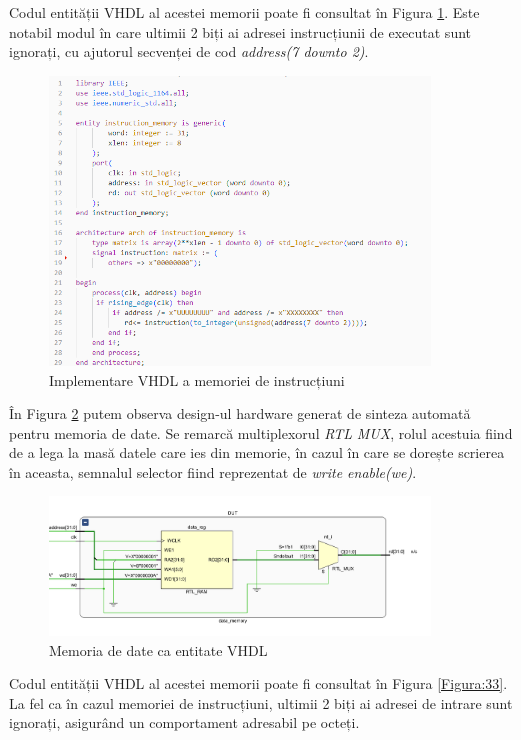 \documentclass[12pt]{article}
\begin{document}
 Codul entității VHDL al acestei memorii poate fi consultat în Figura \ref{Figura:31}. Este notabil modul în care ultimii 2 biți ai adresei instrucțiunii de executat sunt ignorați, cu ajutorul secvenței de cod \textit{address(7 downto 2)}.
 
\newpage
\begin{figure}[h!]
 \includegraphics[width=0.9\textwidth]{instmemcode.png}
 \centering
 \caption{Implementare VHDL a memoriei de instrucțiuni}
 \label{Figura:31}
 \end{figure}
 

În Figura \ref{Figura:32} putem observa design-ul hardware generat de sinteza automată pentru memoria de date. Se remarcă multiplexorul \textit{RTL} \textit{MUX}, rolul acestuia fiind de a lega la masă datele care ies din memorie, în cazul în care se dorește scrierea în aceasta, semnalul selector fiind reprezentat de \textit{write enable(we)}.
 
\begin{figure}[h!]
 \includegraphics[width=0.9\textwidth]{datamem.png}
 \centering
 \caption{Memoria de date ca entitate VHDL}
 \label{Figura:32}
 \end{figure}
  
 Codul entității VHDL al acestei memorii poate fi consultat în Figura \ref{Figura:33}. La fel ca în cazul memoriei de instrucțiuni, ultimii 2 biți ai adresei de intrare sunt ignorați, asigurând un comportament adresabil pe octeți.
 
\end{document}
